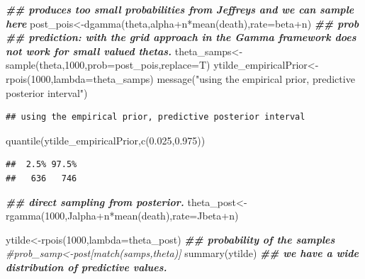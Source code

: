 \documentclass[
]{book}
\newenvironment{Shaded}{\begin{snugshade}}{\end{snugshade}}
\newcommand{\AttributeTok}[1]{\textcolor[rgb]{0.77,0.63,0.00}{#1}}
\newcommand{\CommentTok}[1]{\textcolor[rgb]{0.56,0.35,0.01}{\textit{#1}}}
\newcommand{\DecValTok}[1]{\textcolor[rgb]{0.00,0.00,0.81}{#1}}
\newcommand{\DocumentationTok}[1]{\textcolor[rgb]{0.56,0.35,0.01}{\textbf{\textit{#1}}}}
\newcommand{\FloatTok}[1]{\textcolor[rgb]{0.00,0.00,0.81}{#1}}
\newcommand{\FunctionTok}[1]{\textcolor[rgb]{0.00,0.00,0.00}{#1}}
\newcommand{\NormalTok}[1]{#1}
\newcommand{\OtherTok}[1]{\textcolor[rgb]{0.56,0.35,0.01}{#1}}
\newcommand{\SpecialCharTok}[1]{\textcolor[rgb]{0.00,0.00,0.00}{#1}}
\newcommand{\StringTok}[1]{\textcolor[rgb]{0.31,0.60,0.02}{#1}}
\theoremstyle{definition}
\theoremstyle{definition}
\theoremstyle{definition}
\theoremstyle{definition}
\theoremstyle{remark}
\begin{document}
\begin{Shaded}
\begin{Highlighting}[]
 \DocumentationTok{\#\# produces too small probabilities from Jeffrey\textquotesingle{}s and we can sample here}
\NormalTok{ post\_pois}\OtherTok{\textless{}{-}}\FunctionTok{dgamma}\NormalTok{(theta,alpha}\SpecialCharTok{+}\NormalTok{n}\SpecialCharTok{*}\FunctionTok{mean}\NormalTok{(death),}\AttributeTok{rate=}\NormalTok{beta}\SpecialCharTok{+}\NormalTok{n) }\DocumentationTok{\#\# prob}
\DocumentationTok{\#\#  prediction:  with the grid approach in the Gamma framework does not work for small valued thetas.}
\NormalTok{ theta\_samps}\OtherTok{\textless{}{-}}\FunctionTok{sample}\NormalTok{(theta,}\DecValTok{1000}\NormalTok{,}\AttributeTok{prob=}\NormalTok{post\_pois,}\AttributeTok{replace=}\NormalTok{T)}
\NormalTok{  ytilde\_empiricalPrior}\OtherTok{\textless{}{-}}\FunctionTok{rpois}\NormalTok{(}\DecValTok{1000}\NormalTok{,}\AttributeTok{lambda=}\NormalTok{theta\_samps)}
  \FunctionTok{message}\NormalTok{(}\StringTok{"using the empirical prior, predictive posterior interval"}\NormalTok{)}
\end{Highlighting}
\end{Shaded}

\begin{verbatim}
## using the empirical prior, predictive posterior interval
\end{verbatim}

\begin{Shaded}
\begin{Highlighting}[]
   \FunctionTok{quantile}\NormalTok{(ytilde\_empiricalPrior,}\FunctionTok{c}\NormalTok{(}\FloatTok{0.025}\NormalTok{,}\FloatTok{0.975}\NormalTok{))}
\end{Highlighting}
\end{Shaded}

\begin{verbatim}
##  2.5% 97.5% 
##   636   746
\end{verbatim}

\begin{Shaded}
\begin{Highlighting}[]
 \DocumentationTok{\#\# direct sampling from posterior.}
\NormalTok{ theta\_post}\OtherTok{\textless{}{-}}\FunctionTok{rgamma}\NormalTok{(}\DecValTok{1000}\NormalTok{,Jalpha}\SpecialCharTok{+}\NormalTok{n}\SpecialCharTok{*}\FunctionTok{mean}\NormalTok{(death),}\AttributeTok{rate=}\NormalTok{Jbeta}\SpecialCharTok{+}\NormalTok{n)}
 
 
\NormalTok{   ytilde}\OtherTok{\textless{}{-}}\FunctionTok{rpois}\NormalTok{(}\DecValTok{1000}\NormalTok{,}\AttributeTok{lambda=}\NormalTok{theta\_post) }
 \DocumentationTok{\#\# probability of the samples }
 \CommentTok{\#prob\_samp\textless{}{-}post[match(samps,theta)]}
  \FunctionTok{summary}\NormalTok{(ytilde) }\DocumentationTok{\#\# we have a wide distribution of predictive values.}
\end{Highlighting}
\end{Shaded}
\end{document}
